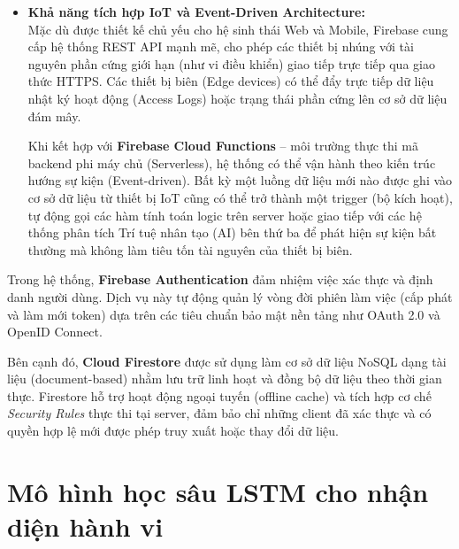 \begin{itemize}
    \item \textbf{Khả năng tích hợp IoT và Event-Driven Architecture:}\\
    Mặc dù được thiết kế chủ yếu cho hệ sinh thái Web và Mobile, Firebase cung cấp hệ thống REST API mạnh mẽ, cho phép các thiết bị nhúng với tài nguyên phần cứng giới hạn (như vi điều khiển) giao tiếp trực tiếp qua giao thức HTTPS. Các thiết bị biên (Edge devices) có thể đẩy trực tiếp dữ liệu nhật ký hoạt động (Access Logs) hoặc trạng thái phần cứng lên cơ sở dữ liệu đám mây. 
    
    Khi kết hợp với \textbf{Firebase Cloud Functions} – môi trường thực thi mã backend phi máy chủ (Serverless), hệ thống có thể vận hành theo kiến trúc hướng sự kiện (Event-driven). Bất kỳ một luồng dữ liệu mới nào được ghi vào cơ sở dữ liệu từ thiết bị IoT cũng có thể trở thành một trigger (bộ kích hoạt), tự động gọi các hàm tính toán logic trên server hoặc giao tiếp với các hệ thống phân tích Trí tuệ nhân tạo (AI) bên thứ ba để phát hiện sự kiện bất thường mà không làm tiêu tốn tài nguyên của thiết bị biên.
\end{itemize}


Trong hệ thống, \textbf{Firebase Authentication} đảm nhiệm việc xác thực và định danh người dùng. Dịch vụ này tự động quản lý vòng đời phiên làm việc (cấp phát và làm mới token) dựa trên các tiêu chuẩn bảo mật nền tảng như OAuth 2.0 và OpenID Connect.

Bên cạnh đó, \textbf{Cloud Firestore} được sử dụng làm cơ sở dữ liệu NoSQL dạng tài liệu (document-based) nhằm lưu trữ linh hoạt và đồng bộ dữ liệu theo thời gian thực. Firestore hỗ trợ hoạt động ngoại tuyến (offline cache) và tích hợp cơ chế \textit{Security Rules} thực thi tại server, đảm bảo chỉ những client đã xác thực và có quyền hợp lệ mới được phép truy xuất hoặc thay đổi dữ liệu.







\iffalse
\section{Mô hình học sâu LSTM cho nhận diện hành vi}

